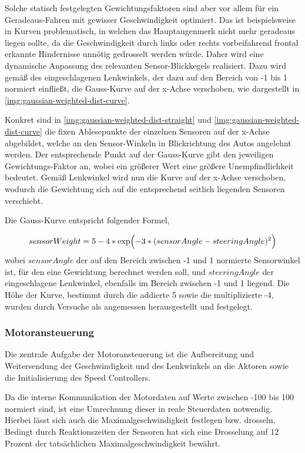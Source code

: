 \documentclass[12pt, a4paper]{scrartcl}
\begin{document}
Solche statisch festgelegten Gewichtungsfaktoren sind aber vor allem für ein Geradeaus-Fahren mit gewisser Geschwindigkeit optimiert. Das ist beispielsweise in Kurven problematisch, in welchen das Hauptaugenmerk nicht mehr geradeaus liegen sollte, da die Geschwindigkeit durch links oder rechts vorbeifahrend frontal erkannte Hindernisse unnötig gedrosselt werden würde. Daher wird eine dynamische Anpassung des relevanten Sensor-Blickkegels realisiert. Dazu wird gemäß des eingeschlagenen Lenkwinkels, der dazu auf den Bereich von -1 bis 1 normiert einfließt, die Gauss-Kurve auf der x-Achse verschoben, wie dargestellt in \autoref{img:gaussian-weighted-dist-curve}.

Konkret sind in \autoref{img:gaussian-weighted-dist-straight} und \ref{img:gaussian-weighted-dist-curve} die fixen Ablesepunkte der einzelnen Sensoren auf der x-Achse abgebildet, welche an den Sensor-Winkeln in Blickrichtung des Autos angelehnt werden. Der entsprechende Punkt auf der Gauss-Kurve gibt den jeweiligen Gewichtungs-Faktor an, wobei ein größerer Wert eine größere Unempfindlichkeit bedeutet. Gemäß Lenkwinkel wird nun die Kurve auf der x-Achse verschoben, wodurch die Gewichtung sich auf die entsprechend seitlich liegenden Sensoren verschiebt.

Die Gauss-Kurve entspricht folgender Formel,

\begin{equation}\label{eq:gaussian-weighted-dist}
sensorWeight= 5 - 4 * \exp\Bigl({-3 * (sensorAngle - steeringAngle)^2}\Bigr)
\end{equation}
wobei $sensorAngle$ der auf den Bereich zwischen -1 und 1 normierte Sensorwinkel ist, für den eine Gewichtung berechnet werden soll, und $steeringAngle$ der eingeschlagene Lenkwinkel, ebenfalls im Bereich zwischen -1 und 1 liegend. Die Höhe der Kurve, bestimmt durch die addierte 5 sowie die multiplizierte -4, wurden durch Versuche als angemessen herausgestellt und festgelegt.

\clearpage

\subsubsection{Motoransteuerung}
Die zentrale Aufgabe der Motoransteuerung ist die Aufbereitung und Weitersendung der Geschwindigkeit und des Lenkwinkels an die Aktoren sowie die Initialisierung des Speed Controllers.

Da die interne Kommunikation der Motordaten auf Werte zwischen -100 bis 100 normiert sind, ist eine Umrechnung dieser in reale Steuerdaten notwendig. Hierbei lässt sich auch die Maximalgeschwindigkeit festlegen bzw. drosseln. Bedingt durch Reaktionszeiten der Sensoren hat sich eine Drosselung auf 12 Prozent der tatsächlichen Maximalgeschwindigkeit bewährt.
\end{document}
